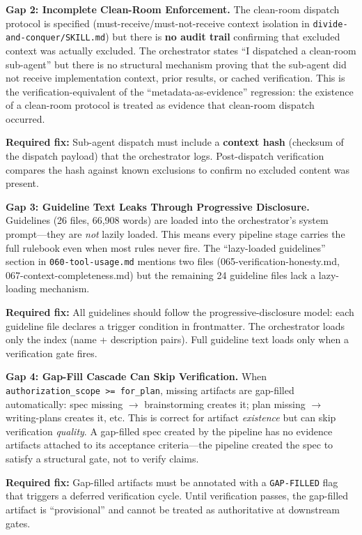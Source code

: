 \documentclass[11pt,a4paper]{article}
\begin{document}
\begin{gapbox}
\textbf{Gap 2: Incomplete Clean-Room Enforcement.}  The clean-room dispatch protocol is specified (must-receive/must-not-receive context isolation in \texttt{divide-and-conquer/SKILL.md}) but there is \textbf{no audit trail} confirming that excluded context was actually excluded.  The orchestrator states ``I dispatched a clean-room sub-agent'' but there is no structural mechanism proving that the sub-agent did not receive implementation context, prior results, or cached verification.  This is the verification-equivalent of the ``metadata-as-evidence'' regression: the existence of a clean-room protocol is treated as evidence that clean-room dispatch occurred.

\textbf{Required fix:}  Sub-agent dispatch must include a \textbf{context hash} (checksum of the dispatch payload) that the orchestrator logs.  Post-dispatch verification compares the hash against known exclusions to confirm no excluded content was present.
\end{gapbox}

\begin{gapbox}
\textbf{Gap 3: Guideline Text Leaks Through Progressive Disclosure.}  Guidelines (26 files, 66,908 words) are loaded into the orchestrator's system prompt---they are \emph{not} lazily loaded.  This means every pipeline stage carries the full rulebook even when most rules never fire.  The ``lazy-loaded guidelines'' section in \texttt{060-tool-usage.md} mentions two files (065-verification-honesty.md, 067-context-completeness.md) but the remaining 24 guideline files lack a lazy-loading mechanism.

\textbf{Required fix:}  All guidelines should follow the progressive-disclosure model: each guideline file declares a trigger condition in frontmatter.  The orchestrator loads only the index (name + description pairs).  Full guideline text loads only when a verification gate fires.
\end{gapbox}

\begin{gapbox}
\textbf{Gap 4: Gap-Fill Cascade Can Skip Verification.}  When \texttt{authorization\_scope >= for\_plan}, missing artifacts are gap-filled automatically: spec missing $\to$ brainstorming creates it; plan missing $\to$ writing-plans creates it, etc.  This is correct for artifact \emph{existence} but can skip verification \emph{quality}.  A gap-filled spec created by the pipeline has no evidence artifacts attached to its acceptance criteria---the pipeline created the spec to satisfy a structural gate, not to verify claims.

\textbf{Required fix:}  Gap-filled artifacts must be annotated with a \texttt{GAP-FILLED} flag that triggers a deferred verification cycle.  Until verification passes, the gap-filled artifact is ``provisional'' and cannot be treated as authoritative at downstream gates.
\end{gapbox}
\end{document}
